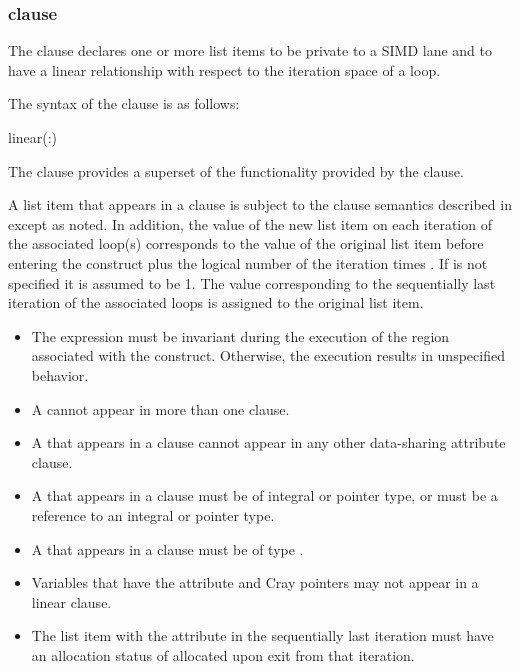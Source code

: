 \subsubsection{ clause}
\label{subsubsec:linear clause}
\summary
The  clause declares one or more list items to be private to a SIMD lane and to 
have a linear relationship with respect to the iteration space of a loop.

\syntax
The syntax of the  clause is as follows:

\begin{boxedcode}
linear(\plc{list[ }:\plc{ linear-step]})
\end{boxedcode}

\descr
The  clause provides a superset of the functionality provided by the  
clause.

A list item that appears in a  clause is subject to the  clause semantics 
described in 
except as noted. In addition, the value of the 
new list item on each iteration of the associated loop(s) corresponds to the value of the 
original list item before entering the construct plus the logical number of the iteration 
times . If  is not specified it is assumed to be 1. The value 
corresponding to the sequentially last iteration of the associated loops is assigned to the 
original list item.

\restrictions
\begin{itemize}
\item The  expression must be invariant during the execution of the region 
associated with the construct. Otherwise, the execution results in unspecified 
behavior.

\item A  cannot appear in more than one  clause.

\item A  that appears in a  clause cannot appear in any other data-sharing 
attribute clause. 

\ccppspecificstart
\item A  that appears in a  clause must be of integral or pointer type, or must be a reference to an integral or pointer type. 
\ccppspecificend

\fortranspecificstart
\item A  that appears in a  clause must be of type .
\item Variables that have the  attribute and Cray pointers may not appear in a linear clause. 
\item The list item with the  attribute in the sequentially last iteration must have an allocation status of allocated upon exit from that iteration. 
\fortranspecificend
\end{itemize}










